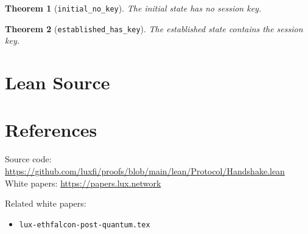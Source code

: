 \documentclass[11pt]{article}
\newtheorem{theorem}{Theorem}
\begin{document}
\begin{theorem}[\texttt{initial\_no\_key}]
The initial state has no session key.
\end{theorem}

\begin{theorem}[\texttt{established\_has\_key}]
The established state contains the session key.
\end{theorem}


\section{Lean Source}


\section{References}
\noindent Source code: \url{https://github.com/luxfi/proofs/blob/main/lean/Protocol/Handshake.lean}\\
\noindent White papers: \url{https://papers.lux.network}

\noindent Related white papers:
\begin{itemize}
  \item \texttt{lux-ethfalcon-post-quantum.tex}
\end{itemize}
\end{document}
